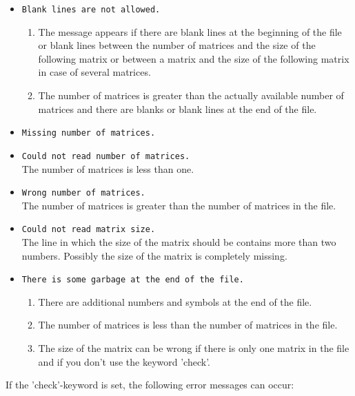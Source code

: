 \begin{itemize}
  \item \texttt{Blank lines are not allowed.}
        \begin{enumerate}
          \item The message appears if there are blank lines at the
                beginning of the file or blank lines between the
                number of matrices and the size of the following
                matrix or between a matrix and the size of the
                following matrix in case of several matrices.
          \item The number of matrices is greater than the actually
                available number of matrices and there are blanks or
                blank lines at the end of the file.
        \end{enumerate}
  \item \texttt{Missing number of matrices.}
  \item \texttt{Could not read number of matrices.} \\
        The number of matrices is less than one.
  \item \texttt{Wrong number of matrices.} \\
        The number of matrices is greater than the number of matrices
        in the file.
  \item \texttt{Could not read matrix size.} \\
        The line in which the size of the matrix should be contains
        more than two numbers. Possibly the size of the matrix is
        completely missing.
  \item \texttt{There is some garbage at the end of the file.}
        \begin{enumerate}
          \item There are additional numbers and symbols at the end of
                the file.
          \item The number of matrices is less than the number of
                matrices in the file.
          \item The size of the matrix can be wrong if there is only
                one matrix in the file and if you don't use the keyword
                'check'.
        \end{enumerate}
\end{itemize}
If the 'check'-keyword is set, the following error messages can occur:
